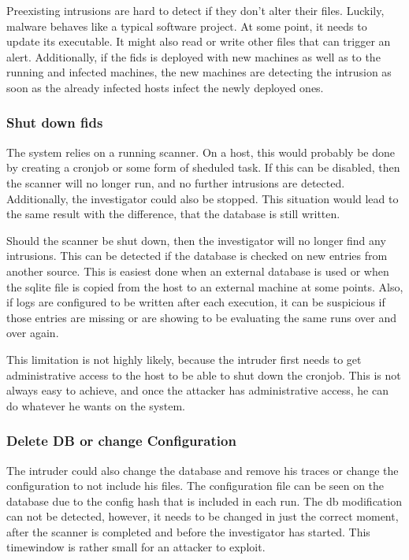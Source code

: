 Preexisting \glspl{intrusion} are hard to detect if they don't alter their files. Luckily, malware behaves like a typical software project. At some point, it needs to update its executable. It might also read or write other files that can trigger an alert. Additionally, if the \gls{fids} is deployed with new machines as well as to the running and infected machines, the new machines are detecting the \gls{intrusion} as soon as the already infected hosts infect the newly deployed ones.

\subsubsection{Shut down \gls{fids}}
\label{sec:limitation:noscan}
The system relies on a running scanner. On a host, this would probably be done by creating a cronjob or some form of sheduled task. If this can be disabled, then the scanner will no longer run, and no further \glspl{intrusion} are detected. Additionally, the investigator could also be stopped. This situation would lead to the same result with the difference, that the database is still written.

Should the scanner be shut down, then the investigator will no longer find any \glspl{intrusion}. This can be detected if the database is checked on new entries from another source. This is easiest done when an external database is used or when the \gls{sqlite} file is copied from the host to an external machine at some points. Also, if logs are configured to be written after each execution, it can be suspicious if those entries are missing or are showing to be evaluating the same runs over and over again. 

This limitation is not highly likely, because the intruder first needs to get administrative access to the host to be able to shut down the cronjob. This is not always easy to achieve, and once the attacker has administrative access, he can do whatever he wants on the system. 

\subsubsection{Delete DB or change Configuration}
\label{sec:limitation:delete}

The intruder could also change the database and remove his traces or change the configuration to not include his files. The configuration file can be seen on the database due to the config hash that is included in each run. The db modification can not be detected, however, it needs to be changed in just the correct moment, after the scanner is completed and before the investigator has started. This timewindow is rather small for an attacker to exploit.

